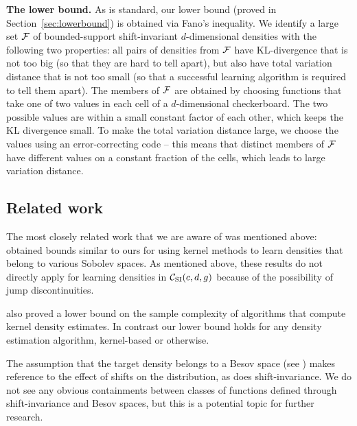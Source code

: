 \noindent
{\bf The lower bound.}  As is standard, our lower bound (proved in Section~\ref{sec:lowerbound})  is obtained
via Fano's inequality.  We identify a large set ${\cal F}$ of
bounded-support shift-invariant $d$-dimensional densities with the
following two properties: all pairs of densities from ${\cal F}$ have
KL-divergence that is not too big (so that they are hard to tell
apart), but also have total variation distance that is not too small
(so that a successful learning algorithm is required to tell them
apart). The members of ${\cal F}$ are obtained by choosing functions that
take one of two values in each cell of a $d$-dimensional checkerboard.
The two possible values are within a small constant factor of each
other, which keeps the KL divergence small.  To make the total
variation distance large, we choose the values using an
error-correcting code -- this means that distinct members of ${\cal F}$
have different values on a constant fraction of the cells, which leads
to large variation distance.

\subsection{Related work} The most closely related work that we are aware
of was mentioned above: 
\citep{holmstrom1992asymptotic}
obtained bounds similar to ours for using kernel methods to learn densities that belong to various 
Sobolev spaces.  As mentioned above, these results do not directly apply for learning densities in
${\mathcal C}_{\mathrm{SI}}(c,d,g)$ because of the possibility of jump discontinuities.
\citep{holmstrom1992asymptotic} also
proved a lower bound on the sample complexity of  algorithms that compute kernel
density estimates.  In contrast our lower bound holds for any density estimation algorithm,
kernel-based or otherwise.

The assumption that the target density belongs to a Besov
space 
(see \citep{kle2009smoothing})
makes reference to the effect of shifts on the distribution, as does shift-invariance.
We do not see any obvious containments between classes of functions defined through
shift-invariance and Besov spaces, but this is a potential topic for further research.  
%

